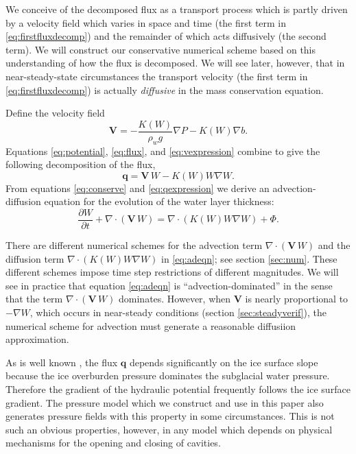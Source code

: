 \documentclass[11pt,final]{amsart}%
\newcommand\bV{\mathbf{V}}
\newcommand\bq{\mathbf{q}}
\newcommand{\Div}{\nabla\cdot}
\newcommand{\grad}{\nabla}
\begin{document}
We conceive of the decomposed flux as a transport process which is partly driven by a velocity field which varies in space and time (the first term in \eqref{eq:firstfluxdecomp}) and the remainder of which acts diffusively (the second term).  We will construct our conservative numerical scheme based on this understanding of how the flux is decomposed.  We will see later, however, that in near-steady-state circumstances the transport velocity (the first term in \eqref{eq:firstfluxdecomp}) is actually \emph{diffusive} in the mass conservation equation.

Define the velocity field
\begin{equation} \label{eq:vexpression}
  \bV = - \frac{K(W)}{\rho_w g} \grad P - K(W) \grad b.
\end{equation}
Equations \eqref{eq:potential}, \eqref{eq:flux}, and \eqref{eq:vexpression} combine to give the following decomposition of the flux,
\begin{equation} \label{eq:qexpression}
  \bq = \bV\, W - K(W) W \grad W.
\end{equation}
From equations \eqref{eq:conserve} and \eqref{eq:qexpression} we derive an advection-diffusion equation \citep{HundsdorferVerwer2010} for the evolution of the water layer thickness:
\begin{equation} \label{eq:adeqn}
  \frac{\partial W}{\partial t} + \Div\left(\bV\, W\right) = \Div \left(K(W) W \grad W\right) + \Phi.
\end{equation}

There are different numerical schemes for the advection term $\Div\left(\bV\, W\right)$ and the diffusion term $\Div \left(K(W) W \grad W\right)$ in \eqref{eq:adeqn}; see section \ref{sec:num}.  These different schemes impose time step restrictions of different magnitudes.  We will see in practice that equation \eqref{eq:adeqn} is ``advection-dominated'' in the sense that the term $\Div\left(\bV\, W\right)$ dominates.  However, when  $\bV$ is nearly proportional to $-\grad W$, which occurs in near-steady conditions (section \ref{sec:steadyverif}), the numerical scheme for advection must generate a reasonable diffusiion approximation.

As is well known \citep{Clarke05}, the flux $\bq$ depends significantly on the ice surface slope because the ice overburden pressure dominates the subglacial water pressure.  Therefore the gradient of the hydraulic potential frequently follows the ice surface gradient.  The pressure model which we construct and use in this paper also generates pressure fields with this property in some circumstances.  This is not such an obvious properties, however, in any model which depends on physical mechanisms for the opening and closing of cavities.
\end{document}
